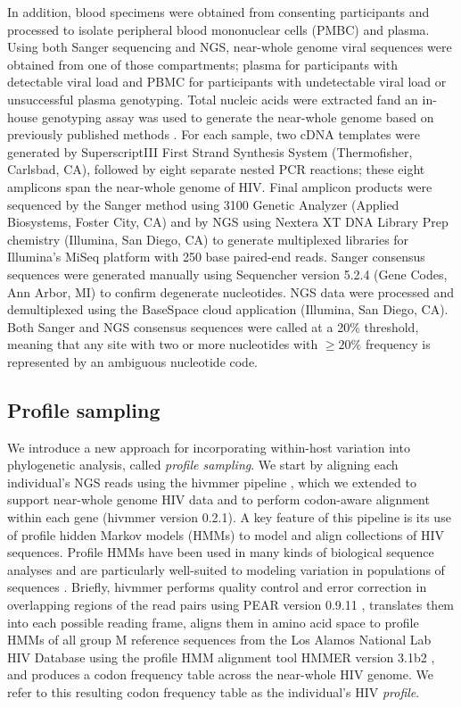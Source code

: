 \documentclass[letterpaper]{article}
\begin{document}
In addition, blood specimens were obtained from consenting participants and processed to isolate peripheral blood mononuclear cells (PMBC) and plasma. Using both Sanger sequencing and NGS, near-whole genome viral sequences were obtained from one of those compartments; plasma for participants with detectable viral load and PBMC for participants with undetectable viral load or unsuccessful plasma genotyping. Total nucleic acids were extracted fand an in-house genotyping assay was used to generate the near-whole genome based on previously published methods \parencite{nadai, di_giallonardo}. For each sample, two cDNA templates were generated by SuperscriptIII First Strand Synthesis System (Thermofisher, Carlsbad, CA), followed by eight separate nested PCR reactions; these eight amplicons span the near-whole genome of HIV. Final amplicon products were sequenced by the Sanger method using 3100 Genetic Analyzer (Applied Biosystems, Foster City, CA) and by NGS using Nextera XT DNA Library Prep chemistry (Illumina, San Diego, CA) to generate multiplexed libraries for Illumina's MiSeq platform with 250 base paired-end reads. Sanger consensus sequences were generated manually using Sequencher version 5.2.4 (Gene Codes, Ann Arbor, MI) to confirm degenerate nucleotides. NGS data were processed and demultiplexed using the BaseSpace cloud application (Illumina, San Diego, CA). Both Sanger and NGS consensus sequences were called at a 20\% threshold, meaning that any site with two or more nucleotides with $\geq 20\%$ frequency is represented by an ambiguous nucleotide code. 

\subsection*{Profile sampling}

We introduce a new approach for incorporating within-host variation into phylogenetic analysis, called \emph{profile sampling}. We start by aligning each individual's NGS reads using the hivmmer pipeline \parencite{howison}, which we extended to support near-whole genome HIV data and to perform codon-aware alignment within each gene (hivmmer version 0.2.1). A key feature of this pipeline is its use of profile hidden Markov models (HMMs) to model and align collections of HIV sequences. Profile HMMs have been used in many kinds of biological sequence analyses and are particularly well-suited to modeling variation in populations of sequences \parencite{eddy2004}. Briefly, hivmmer performs quality control and error correction in overlapping regions of the read pairs using PEAR version 0.9.11 \parencite{zhang}, translates them into each possible reading frame, aligns them in amino acid space to profile HMMs of all group M reference sequences from the Los Alamos National Lab HIV Database \parencite{losalamos} using the profile HMM alignment tool HMMER version 3.1b2 \parencite{eddy2013}, and produces a codon frequency table across the near-whole HIV genome. We refer to this resulting codon frequency table as the individual's HIV \emph{profile}.
\end{document}
